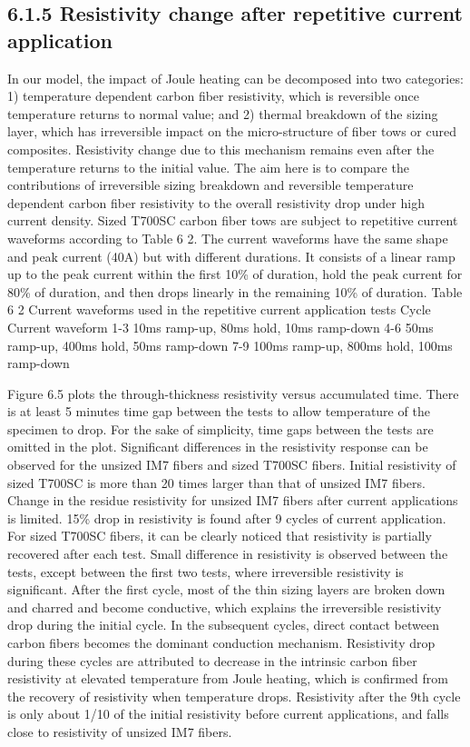 \subsection{6.1.5	Resistivity change after repetitive current application}
In our model, the impact of Joule heating can be decomposed into two categories: 1) temperature dependent carbon fiber resistivity, which is reversible once temperature returns to normal value; and 2) thermal breakdown of the sizing layer, which has irreversible impact on the micro-structure of fiber tows or cured composites. Resistivity change due to this mechanism remains even after the temperature returns to the initial value.
The aim here is to compare the contributions of irreversible sizing breakdown and reversible temperature dependent carbon fiber resistivity to the overall resistivity drop under high current density. Sized T700SC carbon fiber tows are subject to repetitive current waveforms according to Table 6 2. The current waveforms have the same shape and peak current (40A) but with different durations. It consists of a linear ramp up to the peak current within the first 10\% of duration, hold the peak current for 80\% of duration, and then drops linearly in the remaining 10\% of duration.  
Table 6 2 Current waveforms used in the repetitive current application tests
Cycle 	Current waveform
1-3	10ms ramp-up, 80ms hold, 10ms ramp-down
4-6	50ms ramp-up, 400ms hold, 50ms ramp-down
7-9	100ms ramp-up, 800ms hold, 100ms ramp-down

Figure 6.5 plots the through-thickness resistivity versus accumulated time. There is at least 5 minutes time gap between the tests to allow temperature of the specimen to drop. For the sake of simplicity, time gaps between the tests are omitted in the plot. 
Significant differences in the resistivity response can be observed for the unsized IM7 fibers and sized T700SC fibers. Initial resistivity of sized T700SC is more than 20 times larger than that of unsized IM7 fibers.
Change in the residue resistivity for unsized IM7 fibers after current applications is limited. 15\% drop in resistivity is found after 9 cycles of current application. For sized T700SC fibers, it can be clearly noticed that resistivity is partially recovered after each test. Small difference in resistivity is observed between the tests, except between the first two tests, where irreversible resistivity is significant. After the first cycle, most of the thin sizing layers are broken down and charred and become conductive, which explains the irreversible resistivity drop during the initial cycle. In the subsequent cycles, direct contact between carbon fibers becomes the dominant conduction mechanism. Resistivity drop during these cycles are attributed to decrease in the intrinsic carbon fiber resistivity at elevated temperature from Joule heating, which is confirmed from the recovery of resistivity when temperature drops. Resistivity after the 9th cycle is only about 1/10 of the initial resistivity before current applications, and falls close to resistivity of unsized IM7 fibers.

